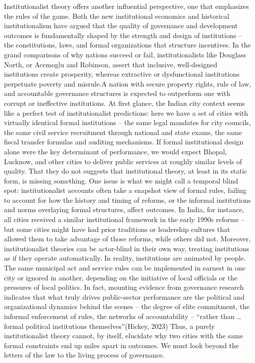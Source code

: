 Institutionalist theory offers another influential perspective, one that emphasizes the rules of the game. Both the new institutional economics and historical institutionalism have argued that the quality of governance and development outcomes is fundamentally shaped by the strength and design of institutions – the constitutions, laws, and formal organizations that structure incentives. In the grand comparisons of why nations succeed or fail, institutionalists like Douglass North, or Acemoglu and Robinson, assert that inclusive, well-designed institutions create prosperity, whereas extractive or dysfunctional institutions perpetuate poverty and misrule.A nation with secure property rights, rule of law, and accountable governance structures is expected to outperform one with corrupt or ineffective institutions. At first glance, the Indian city context seems like a perfect test of institutionalist predictions: here we have a set of cities with virtually identical formal institutions – the same legal mandates for city councils, the same civil service recruitment through national and state exams, the same fiscal transfer formulas and auditing mechanisms. If formal institutional design alone were the key determinant of performance, we would expect Bhopal, Lucknow, and other cities to deliver public services at roughly similar levels of quality. That they do not suggests that institutional theory, at least in its static form, is missing something. One issue is what we might call a temporal blind spot: institutionalist accounts often take a snapshot view of formal rules, failing to account for how the history and timing of reforms, or the informal institutions and norms overlaying formal structures, affect outcomes. In India, for instance, all cities received a similar institutional framework in the early 1990s reforms – but some cities might have had prior traditions or leadership cultures that allowed them to take advantage of those reforms, while others did not. Moreover, institutionalist theories can be actor-blind in their own way, treating institutions as if they operate automatically. In reality, institutions are animated by people. The same municipal act and service rules can be implemented in earnest in one city or ignored in another, depending on the initiative of local officials or the pressures of local politics. In fact, mounting evidence from governance research indicates that what truly drives public-sector performance are the political and organizational dynamics behind the scenes – the degree of elite commitment, the informal enforcement of rules, the networks of accountability – “rather than … formal political institutions themselves”(Hickey, 2023) Thus, a purely institutionalist theory cannot, by itself, elucidate why two cities with the same formal constraints end up miles apart in outcomes. We must look beyond the letters of the law to the living process of governance.

